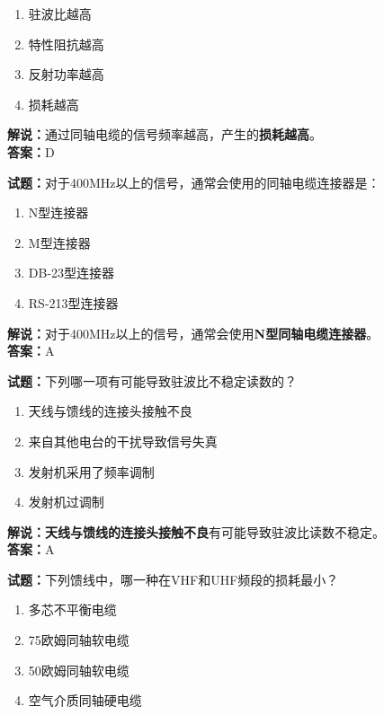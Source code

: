 \documentclass{ctexbook}
\begin{document}
\begin{enumerate}[leftmargin=3em]
	\item 驻波比越高
	\item 特性阻抗越高
	\item 反射功率越高
	\item 损耗越高
\end{enumerate}

\noindent\textbf{解说：}通过同轴电缆的信号频率越高，产生的\textbf{损耗越高}。\\\noindent\textbf{答案：}D


\bigskip


\noindent\textbf{试题：}对于400\si{\MHz}以上的信号，通常会使用的同轴电缆连接器是：

\begin{enumerate}[leftmargin=3em]
	\item N型连接器
	\item M型连接器
	\item DB-23型连接器
	\item RS-213型连接器
\end{enumerate}

\noindent\textbf{解说：}对于400\si{\MHz}以上的信号，通常会使用\textbf{N型同轴电缆连接器}。\\\noindent\textbf{答案：}A


\bigskip


\noindent\textbf{试题：}下列哪一项有可能导致驻波比不稳定读数的？

\begin{enumerate}[leftmargin=3em]
	\item 天线与馈线的连接头接触不良
	\item 来自其他电台的干扰导致信号失真
	\item 发射机采用了频率调制
	\item 发射机过调制
\end{enumerate}

\noindent\textbf{解说：}\textbf{天线与馈线的连接头接触不良}有可能导致驻波比读数不稳定。\\\noindent\textbf{答案：}A


\bigskip


\noindent\textbf{试题：}下列馈线中，哪一种在VHF和UHF频段的损耗最小？

\begin{enumerate}[leftmargin=3em]
	\item 多芯不平衡电缆
	\item 75欧姆同轴软电缆
	\item 50欧姆同轴软电缆
	\item 空气介质同轴硬电缆
\end{enumerate}
\end{document}
